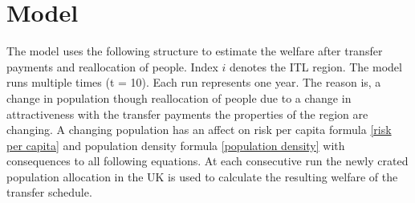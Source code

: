 \documentclass[10pt,a4paper]{article}
\begin{document}
\section{Model}
\newpage
The model uses the following structure to estimate the welfare after transfer payments and reallocation of people. Index $i$ denotes the ITL region.
The model runs multiple times (t = 10). Each run represents one year. The reason is, a change in population though reallocation of people due to a change in attractiveness with the transfer payments the properties of the region are changing. A changing population has an affect on risk per capita formula \ref{risk per capita} and population density formula \ref{population density} with consequences to all following equations. At each consecutive run the newly crated population allocation in the UK is used to calculate the resulting welfare of the transfer schedule.
\newline
\end{document}
